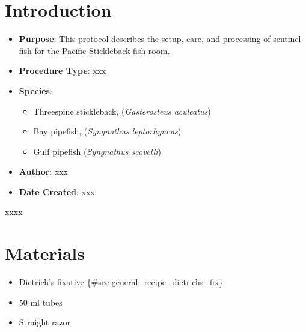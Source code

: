 \documentclass[
  letterpaper,
  DIV=11,
  numbers=noendperiod]{scrreprt}
\providecommand{\tightlist}{%
  \setlength{\itemsep}{0pt}\setlength{\parskip}{0pt}}\usepackage{longtable,booktabs,array}
\begin{document}
\hypertarget{introduction-53}{%
\section{Introduction}\label{introduction-53}}

\begin{itemize}
\tightlist
\item
  \textbf{Purpose}: This protocol describes the setup, care, and
  processing of sentinel fish for the Pacific Stickleback fish room.
\item
  \textbf{Procedure Type}: xxx
\item
  \textbf{Species}:

  \begin{itemize}
  \tightlist
  \item
    Threespine stickleback, (\emph{Gasterosteus aculeatus})
  \item
    Bay pipefish, (\emph{Syngnathus leptorhyncus})
  \item
    Gulf pipefish (\emph{Syngnathus scovelli})
  \end{itemize}
\item
  \textbf{Author}: xxx
\item
  \textbf{Date Created}: xxx
\end{itemize}

\begin{tcolorbox}[enhanced jigsaw, rightrule=.15mm, title=\textcolor{quarto-callout-warning-color}{\faExclamationTriangle}\hspace{0.5em}{NOTES}, titlerule=0mm, opacitybacktitle=0.6, toprule=.15mm, bottomrule=.15mm, opacityback=0, left=2mm, colframe=quarto-callout-warning-color-frame, breakable, coltitle=black, colback=white, colbacktitle=quarto-callout-warning-color!10!white, bottomtitle=1mm, leftrule=.75mm, toptitle=1mm, arc=.35mm]

xxxx

\end{tcolorbox}

\hypertarget{materials-51}{%
\section{Materials}\label{materials-51}}

\begin{itemize}
\tightlist
\item
  Dietrich's fixative \{\#sec-general\_recipe\_dietrichs\_fix\}
\item
  50 ml tubes
\item
  Straight razor
\end{itemize}
\end{document}
